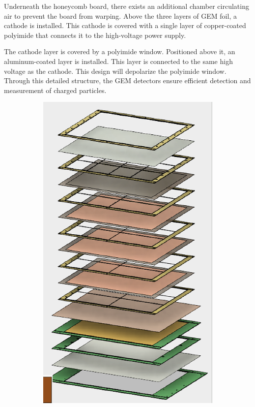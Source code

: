 Underneath the honeycomb board, there exists an additional chamber circulating air to prevent the board from warping. Above the three layers of GEM foil, a cathode is installed. This cathode is covered with a single layer of copper-coated polyimide that connects it to the high-voltage power supply.

The cathode layer is covered by a polyimide window. Positioned above it, an aluminum-coated layer is installed. This layer is connected to the same high voltage as the cathode. This design will depolarize the polyimide window. Through this detailed structure, the GEM detectors ensure efficient detection and measurement of charged particles.


\begin{figure}
     \centering
     \begin{subfigure}[b]{0.2\textwidth}
         \centering
         \includegraphics[width=\textwidth]{images/chap3/gem_structure.png}

\end{subfigure}
\end{figure}

